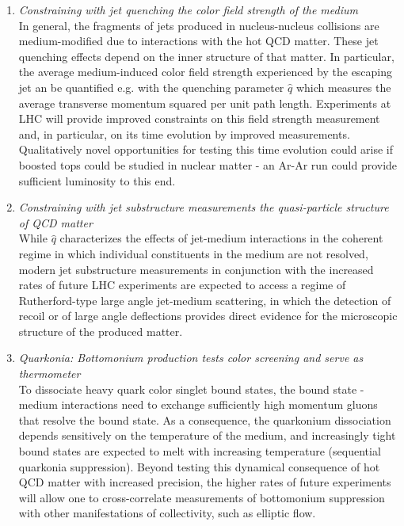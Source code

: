 \documentclass[../report.tex]{subfiles}
\begin{document}
\begin{enumerate}
\item {\it Constraining with jet quenching the color field strength of the medium}\\ In general, the fragments of jets produced in nucleus-nucleus collisions are medium-modified due to  interactions with the hot QCD matter. These jet quenching effects depend on the inner structure of that matter. In particular, the average medium-induced color field strength experienced by the escaping jet an be quantified e.g. with the quenching parameter $\hat q$  which measures the average transverse momentum squared per unit path length. Experiments at LHC will provide improved constraints on this field strength measurement and, in particular, on its time evolution by improved measurements.  Qualitatively novel opportunities for testing this time evolution could arise if boosted tops could be studied in nuclear matter - an Ar-Ar run could provide sufficient luminosity to this end.
\item {\it Constraining with jet substructure measurements the quasi-particle structure of QCD matter}\\ While $\hat q$  characterizes the effects of jet-medium interactions in the coherent regime in which individual constituents in the medium are not resolved, modern jet substructure measurements in conjunction with the increased rates of future LHC experiments are expected to access a regime of Rutherford-type large angle jet-medium scattering, in which the detection of recoil or of large angle deflections provides direct evidence for the microscopic structure of the produced matter.  
\item {\it Quarkonia: Bottomonium production tests color screening and serve as thermometer}\\To dissociate heavy quark color singlet bound states, the bound state - medium interactions need to exchange sufficiently high momentum gluons that resolve the bound state. As a consequence, the quarkonium dissociation depends sensitively on the temperature of the medium, and increasingly tight bound states are expected to melt with increasing temperature (sequential quarkonia suppression). Beyond testing this dynamical consequence of hot QCD matter with increased precision, the higher rates of future experiments will allow one to cross-correlate measurements of bottomonium suppression with other manifestations of collectivity, such as elliptic flow.

\end{enumerate}
\end{document}
